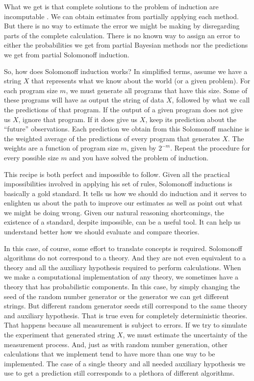 \documentclass{article}
\begin{document}
	What we get is that complete solutions to the problem of induction are incomputable \cite{solomonoff1996a}. We can obtain estimates from partially applying each method. But there is no way to estimate the error we might be making by disregarding parts of the complete calculation. There is no known way to assign an error to either the probabilities we get from partial Bayesian methods nor the predictions we get from partial Solomonoff induction.
	
	
	So, how does Solomonoff induction works? In simplified terms, assume we have a string $X$ that represents what we know about the world (or a given problem). For each program size $m$, we must generate all programs that have this size.  Some of these programs will have as output the string of data $X$, followed by what we call the predictions of that program. If the output of a given program does not give us $X$, ignore that program. If it does give us $X$, keep its prediction about the ``future'' observations. Each prediction we obtain from this Solomonoff machine is the weighted average of the predictions of every program that generates $X$. The weights are a function of program size $m$, given by $2^{-m}$. Repeat the procedure for every possible size $m$ and you have solved the problem of induction.
	
	This recipe is both perfect and impossible to follow. Given all the practical impossibilities involved in applying his set of rules, Solomonoff inductions is basically a gold standard. It tells us how we should do induction and it serves to enlighten us about the path to improve our estimates as well as point out what we might be doing wrong.   Given our natural reasoning shortcomings, the existence of a standard, despite impossible, can be a useful tool. It can help us understand better how we should evaluate and compare theories. 
	
	
	
	In this case, of course, some effort to translate concepts is required. Solomonoff algorithms do not correspond to a theory. And they are not even equivalent to a theory and all the auxiliary hypothesis required to perform calculations. When we make a computational implementation of any theory, we sometimes have a theory that has probabilistic components. In this case, by simply changing the seed of the random number generator or the generator we can get different strings. But different random generator seeds still correspond to the same theory and auxiliary hypothesis. That is true even for completely deterministic theories.  That happens because all measurement is subject to errors. If we try to simulate the experiment that generated string $X$, we must estimate the uncertainty of the measurement process. And, just as with random number generation, other calculations that we implement tend to have more than one way to be implemented. The case of a single theory  and all needed auxiliary hypothesis we use to get a prediction still corresponds to a plethora of different algorithms. 
	
\end{document}
